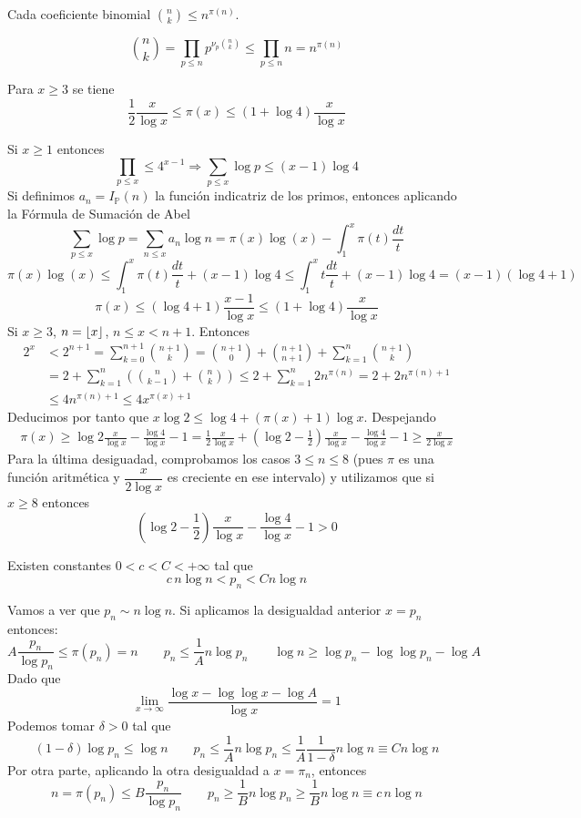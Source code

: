 \documentclass[TAN.tex]{subfiles}
\begin{document}
\begin{coro}
Cada coeficiente binomial $\binom{n}{k} ≤ n^{π(n)}$.
\end{coro}
\begin{dem}
\[ \binom{n}{k} = \prod_{p≤n} p^{\nu_p\binom{n}{k}} ≤ \prod_{p≤n} n = n^{π(n)} \]
\end{dem}
\begin{teorema}[Chebyshev] Para $x\geq 3$ se tiene
$$
\frac{1}{2}\frac{x}{\log x}\leq \pi(x)\leq (1+\log 4)\frac{x}{\log x}
$$
\end{teorema}
\begin{dem}
Si $x\geq 1$ entonces 
$$\prod_{p\leq x}\leq 4^{x-1} \Rightarrow \sum_{p\leq x} \log p \leq (x-1) \log 4$$
Si definimos $a_n=I_{\mathbb{P}}(n)$ la función indicatriz de los primos, entonces aplicando la Fórmula de Sumación de Abel
$$\sum_{p\leq x} \log p = \sum_{n\leq x}a_n \log n = \pi(x)\log(x)-\int_1^x \pi(t)\frac{dt}{t}$$
$$\pi(x)\log(x) \leq \int_1^x \pi(t)\frac{dt}{t} + (x-1)\log 4
\leq \int_1^x t\frac{dt}{t} + (x-1)\log4 = (x-1)(\log4 +1)$$
$$ \pi(x)\leq (\log 4 +1) \frac{x-1}{\log x}\leq (1+\log 4)\frac{x}{\log x}$$
Si $x\geq 3$, $n=\left\lfloor{ x }\right\rfloor$, $n\leq x < n+1$. Entonces
\begin{align*}
2^x &< 2^{n+1} = \sum_{k=0}^{n+1}\binom{n+1}{k} = \binom{n+1}{0}+\binom{n+1}{n+1} + \sum_{k=1}^n \binom{n+1}{k}\\
&= 2 +  \sum_{k=1}^n \left(\binom{n}{k-1}+\binom{n}{k}\right) \leq 2 + \sum_{k=1}^n 2n^{\pi(n)} = 2+2n^{\pi(n)+1} \\
&\leq 4n^{\pi(n)+1}\leq 4x^{\pi(x)+1}
\end{align*}
Deducimos por tanto que $x \log 2\leq \log 4 + (\pi(x)+1)\log x$. Despejando	
\begin{align*}
 \pi(x) \geq \log 2 \frac{x}{\log x} -\frac{\log 4}{\log x}-1 = \frac{1}{2}\frac{x}{\log x} +  \left(\log 2 - \frac{1}{2}\right)\frac{x}{\log x} - \frac{\log4}{\log x}-1 \geq \frac{x}{2\log{x}}
\end{align*}
Para la última desiguadad, comprobamos los casos $3\leq n \leq 8$ (pues $\pi$ es una función aritmética y $\dfrac{x}{2\log{x}}$ es creciente en ese intervalo) y utilizamos que si $x\geq 8$ entonces
$$
 \left(\log 2 - \frac{1}{2}\right)\frac{x}{\log x} - \frac{\log4}{\log x}-1 > 0
$$
\end{dem}
\begin{coro}
Existen constantes $0<c<C<+∞$ tal que
\[{c}\,{n} \log n < p_n < C n \log n \]
\end{coro}
\begin{dem}
Vamos a ver que $p_n \sim n \log n$. Si aplicamos la desigualdad anterior $x=p_n$ entonces:
$$
A\frac{p_n}{\log p_n} \leq \pi(p_n) = n \qquad  p_n \leq \frac{1}{A}n\log p_n \qquad \log n \geq \log p_n - \log \log p_n - \log A
$$
Dado que
$$
\lim_{x\to\infty}\frac{\log x-\log\log x-\log A}{\log x}= 1
$$
Podemos tomar $\delta >0$ tal que
$$
(1-\delta)\log p_n \leq \log n \qquad p_n \leq \frac{1}{A}n\log p_n\leq \frac{1}{A}\frac{1}{1-\delta}n \log n\equiv C n \log n$$
Por otra parte, aplicando la otra desigualdad a $x=\pi_n$, entonces
$$n=\pi(p_n) \leq B \dfrac{p_n}{\log p_n} \qquad p_n \geq \frac{1}{B}n\log p_n \geq \frac{1}{B}n \log n\equiv c\,n\log n$$
\end{dem}
\end{document}
